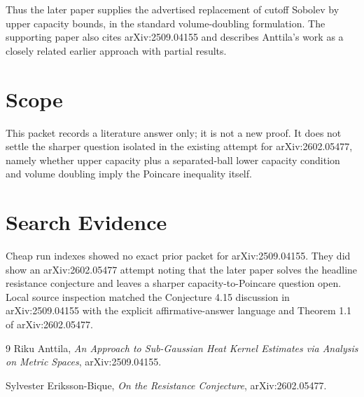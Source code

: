 \documentclass[11pt]{article}
\begin{document}
Thus the later paper supplies the advertised replacement of cutoff Sobolev by
upper capacity bounds, in the standard volume-doubling formulation. The
supporting paper also cites arXiv:2509.04155 and describes Anttila's work as
a closely related earlier approach with partial results.

\section*{Scope}

This packet records a literature answer only; it is not a new proof. It does
not settle the sharper question isolated in the existing attempt for
arXiv:2602.05477, namely whether upper capacity plus a separated-ball lower
capacity condition and volume doubling imply the Poincare inequality itself.

\section*{Search Evidence}

Cheap run indexes showed no exact prior packet for arXiv:2509.04155. They did
show an arXiv:2602.05477 attempt noting that the later paper solves the
headline resistance conjecture and leaves a sharper capacity-to-Poincare
question open. Local source inspection matched the Conjecture 4.15 discussion
in arXiv:2509.04155 with the explicit affirmative-answer language and Theorem
1.1 of arXiv:2602.05477.

\begin{thebibliography}{9}
Riku Anttila, \emph{An Approach to Sub-Gaussian Heat Kernel Estimates via
Analysis on Metric Spaces}, arXiv:2509.04155.

Sylvester Eriksson-Bique, \emph{On the Resistance Conjecture},
arXiv:2602.05477.
\end{thebibliography}
\end{document}
